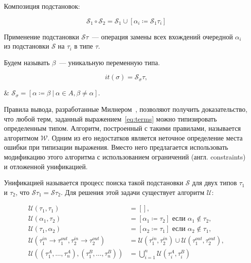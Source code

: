 Композиция подстановок:

\begin{equation}
    \label{eq:subst_comp}
    \mathcal{S}_1 \circ \mathcal{S}_2 = \mathcal{S}_1 \cup \left[ \alpha_i \coloneqq \mathcal{S}_1 \tau_i \right]
\end{equation}

Применение подстановки $\mathcal{S} \tau$~--- операция замены всех вхождений очередной $\alpha_i$ из подстановки $\mathcal{S}$ на $\tau_i$ в типе $\tau$.

Будем называть $\beta$~--- уникальную переменную типа.

\begin{equation}
    \label{eq:instantiate}
    it(\sigma) = \mathcal{S}_{\sigma} \tau,
\end{equation}
\begin{eqrem}
    & $\mathcal{S}_\sigma = \left[ \alpha \coloneqq \beta ~|~ \alpha \in A, \beta \ne \alpha \right]$.\\
\end{eqrem}

Правила вывода, разработанные Милнером~\cite{UrbanN2009}, позволяют получить доказательство, что любой терм, заданный выражением~\eqref{eq:terms} можно типизировать определенным типом.
Алгоритм, построенный с такими правилами, называется алгоритмом $\mathcal{W}$.
Одним из его недостатков является неточное определение места ошибки при типизации выражения.
Вместо него предлагается использовать модификацию этого алгоритма с использованием ограничений (англ. constraints) и отложенной унификацией.

Унификацией называется процесс поиска такой подстановки $\mathcal{S}$ для двух типов $\tau_1$ и $\tau_2$, что $\mathcal{S} \tau_1 = \mathcal{S} \tau_2$.
Для решения этой задачи существует алгоритм $\mathcal{U}$:

\begin{equation}
    \label{eq:algo_u}
    \begin{aligned}
        \mathcal{U}(\tau_1, \tau_1) &= \left[  \right], \\
        \mathcal{U}(\alpha_1, \tau_2) &= \left[ \alpha_1 \coloneqq \tau_2 \right] \text{ если } \alpha_1 \notin \tau_2, \\
        \mathcal{U}(\tau_1, \alpha_2) &= \left[ \alpha_2 \coloneqq \tau_1 \right] \text{ если } \alpha_2 \notin \tau_1, \\
        \mathcal{U}(\tau^{in}_1 \to \tau^{out}_1, \tau^{in}_2 \to \tau^{out}_2) &= \mathcal{U}(\tau^{in}_1, \tau^{in}_2) \cup \mathcal{U}(\tau^{out}_1, \tau^{out}_2), \\
        \mathcal{U}((\tau_1^A, \ldots, \tau_n^A), (\tau_1^B, \ldots, \tau_n^B)) &= \bigcup_{i = 1}^{n} \mathcal{U}(\tau_i^A, \tau_i^B)
    \end{aligned}
\end{equation}


